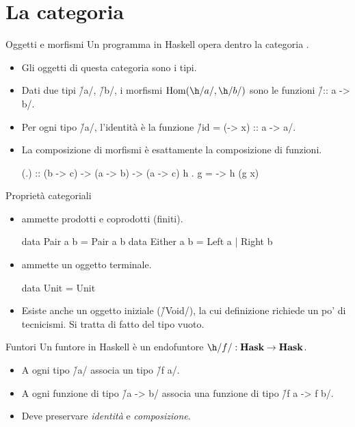 \section*{La categoria \protect\Hask{}}

\begin{frame}[fragile]{\secname}{Oggetti e morfismi}
Un programma in Haskell opera dentro la categoria \Hask{}.
\begin{itemize}[<+(1)->]
\item Gli oggetti di questa categoria sono i tipi.
\item Dati due tipi \h/a/, \h/b/, i morfismi $\Hom(\h/a/, \h/b/)$ sono le funzioni \h/:: a -> b/.
\item Per ogni tipo \h/a/, l'identità è la funzione \h/id = (\x -> x) :: a -> a/.
\item La composizione di morfismi è esattamente la composizione di funzioni.

\begin{haskellcode}
(.) :: (b -> c) -> (a -> b) -> (a -> c)
h . g = \x -> h (g x)
\end{haskellcode}
\end{itemize}
\end{frame}

\begin{frame}[fragile]{\secname}{Proprietà categoriali}
\begin{itemize}[<+->]
\item \Hask{} ammette prodotti e coprodotti (finiti).

\begin{haskellcode}
data Pair a b = Pair a b
data Either a b = Left a | Right b
\end{haskellcode}

\item \Hask{} ammette un oggetto terminale.

\begin{haskellcode}
data Unit = Unit
\end{haskellcode}

\item Esiste anche un oggetto iniziale (\h/Void/), la cui definizione richiede un po' di tecnicismi. Si tratta di fatto del tipo vuoto.
\end{itemize}
\end{frame}

\begin{frame}[fragile]{\secname}{Funtori}
Un funtore in Haskell è un endofuntore $\h/f/:\Hask{}\to\Hask{}$.

\begin{itemize}[<+(1)->]
\item A ogni tipo \h/a/ associa un tipo \h/f a/.
\item A ogni funzione di tipo \h/a -> b/ associa una funzione di tipo \h/f a -> f b/.
\item Deve preservare \emph{identità} e \emph{composizione}.
\end{itemize}
\end{frame}

